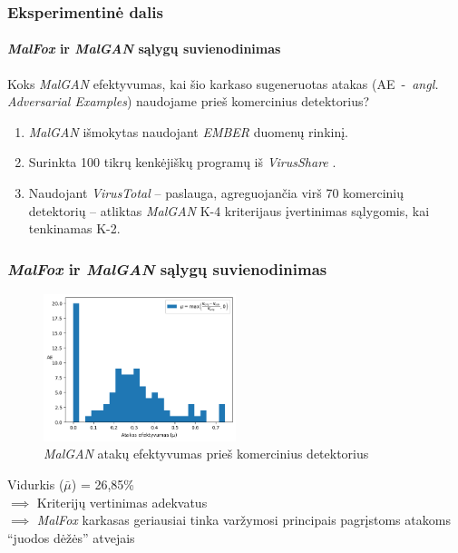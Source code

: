 \begin{frame}
    \frametitle{Eksperimentinė dalis}
    \framesubtitle{\textit{MalFox} ir \textit{MalGAN} sąlygų suvienodinimas}
    Koks \textit{MalGAN} efektyvumas, kai šio karkaso sugeneruotas atakas (AE~-~\textit{angl. Adversarial Examples}) naudojame prieš komercinius detektorius? \pause
    \vspace{20pt}
    \begin{enumerate}
        \item \textit{MalGAN} išmokytas naudojant \textit{EMBER} \cite{andersonEMBEROpenDataset2018} duomenų rinkinį. \pause
        \item Surinkta 100 tikrų kenkėjiškų programų iš \textit{VirusShare} \cite{VirusSharecom}. \pause
        \item Naudojant \textit{VirusTotal} \cite{VirusTotalHome} -- paslauga, agreguojančia virš 70 komercinių detektorių -- atliktas \textit{MalGAN} K-4 kriterijaus įvertinimas sąlygomis, kai tenkinamas K-2. 
    \end{enumerate}
    
\end{frame}


\begin{frame}
    \frametitle{\textit{MalFox} ir \textit{MalGAN} sąlygų suvienodinimas}
    \begin{figure}
        \begin{small}
            \begin{center}
                \includegraphics[width=0.5\textwidth]{resources/mu_distribution.png}
            \end{center}
            \caption{\textit{MalGAN} atakų efektyvumas prieš komercinius detektorius}
        \end{small}
    \end{figure} \pause

    Vidurkis ($\bar{\mu}$) = 26,85\;\% \pause \\ $\implies$ Kriterijų vertinimas
    adekvatus \pause \\ $\implies$ \textit{MalFox} karkasas geriausiai tinka
    varžymosi principais pagrįstoms atakoms \enquote{juodos dėžės} atvejais

\end{frame}

